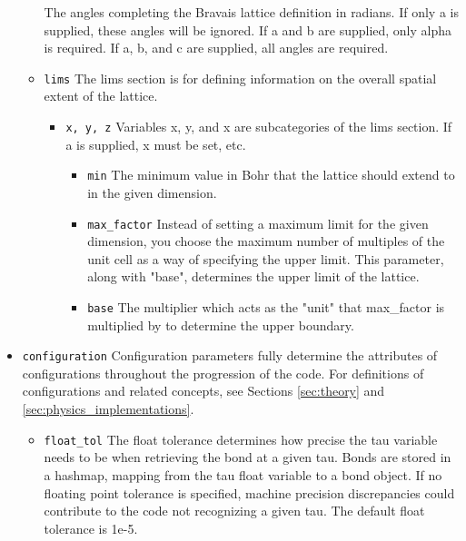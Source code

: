 \begin{itemize}
\begin{itemize}
        The angles completing the Bravais lattice definition in radians. 
        If only a is supplied, these angles will be ignored.
        If a and b are supplied, only alpha is required. 
        If a, b, and c are supplied, all angles are required.
      \item \texttt{lims}
        The lims section is for defining information on the overall spatial 
        extent of the lattice. 
        \begin{itemize}
          \item \texttt{x, y, z}
            Variables x, y, and x are subcategories of the lims section.
            If a is supplied, x must be set, etc. 
            \begin{itemize}
              \item \texttt{min}
                The minimum value in Bohr that the lattice should extend to in
                the given dimension.
              \item \texttt{max\_factor}
                Instead of setting a maximum limit for the given dimension, you
                choose the maximum number of multiples of the unit cell as a 
                way of specifying the upper limit.  
                This parameter, along with "base", determines the upper limit 
                of the lattice.
              \item \texttt{base}
                The multiplier which acts as the "unit" that max\_factor is 
                multiplied by to determine the upper boundary. 
            \end{itemize}
        \end{itemize}
    \end{itemize}
  \item \texttt{configuration}
    Configuration parameters fully determine the attributes of configurations
    throughout the progression of the code. 
    For definitions of configurations and related concepts, see Sections
    \ref{sec:theory} and \ref{sec:physics_implementations}.
    \begin{itemize}
      \item \texttt{float\_tol}
        The float tolerance determines how precise the tau variable needs to be
        when retrieving the bond at a given tau. 
        Bonds are stored in a hashmap, mapping from the tau float variable to a
        bond object. 
        If no floating point tolerance is specified, machine precision 
        discrepancies could contribute to the code not recognizing a given tau. 
        The default float tolerance is 1e-5. 

\end{itemize}
\end{itemize}
